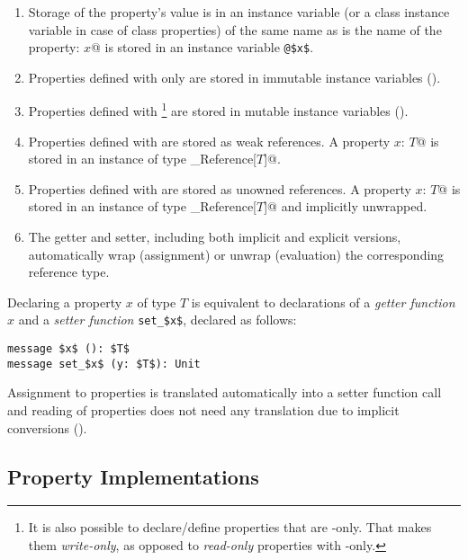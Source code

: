 \begin{enumerate}
  \item Storage of the property's value is in an instance variable (or a class instance variable in case of class properties) of the same name as is the name of the property: \lstinline@property $x$@ is stored in an instance variable \lstinline+@$x$+. 

  \item Properties defined with only  are stored in immutable instance variables (). 

  \item Properties defined with \footnote{It is also possible to declare/define properties that are -only. That makes them {\em write-only}, as opposed to {\em read-only} properties with -only.} are stored in mutable instance variables (). 

  \item Properties defined with  are stored as weak references. A property \lstinline@property $x$: $T$@ is stored in an instance of type \lstinline@Weak_Reference[$T$]@. 

  \item Properties defined with  are stored as unowned references. A property \lstinline@property $x$: $T$@ is stored in an instance of type \lstinline@Weak_Reference[$T$]@ and implicitly unwrapped. 

  \item The getter and setter, including both implicit and explicit versions, automatically wrap (assignment) or unwrap (evaluation) the corresponding reference type.
\end{enumerate}

Declaring a property $x$ of type $T$ is equivalent to declarations of a {\em getter function} $x$ and a {\em setter function} \lstinline!set_$x$!, declared as follows:

\begin{lstlisting}
message $x$ (): $T$
message set_$x$ (y: $T$): Unit
\end{lstlisting}

Assignment to properties is translated automatically into a setter function call and reading of properties does not need any translation due to implicit conversions (). 






\subsection{Property Implementations}
\label{sec:property-impl}

